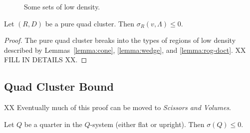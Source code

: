 \begin{figure}[htb]
  \centering
  \caption{Some sets of low density.}
  \label{fig:doct}
\end{figure}

\begin{lemma}\label{lemma:pure0}
Let $(R,D)$ be a pure quad cluster.  Then
  $\sigma_R(v,\Lambda)\le 0$.
\end{lemma}

\begin{proof}  The pure quad cluster breaks into the types
of regions of low density described by Lemmas~\ref{lemma:cone},
\ref{lemma:wedge}, and \ref{lemma:rog-doct}.  XX FILL IN DETAILS XX.
\end{proof}




\subsection{Quad Cluster Bound}

XX Eventually much of this proof can be moved to {\it Scissors and Volumes}.

\begin{lemma} \label{lemma:quarter0}
Let $Q$ be a quarter in the $Q$-system (either flat or upright).
Then $\sigma(Q)\le 0$. 
\end{lemma}

